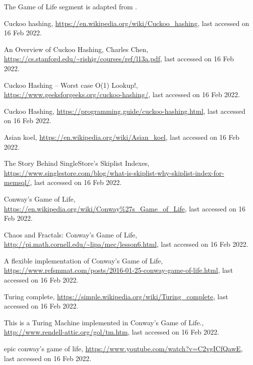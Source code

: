 \documentclass[addpoints]{exam}
\begin{document}
The Game of Life segment is adapted from \cite{gol_impl}.

\newpage
\begin{thebibliography}{9}

Cuckoo hashing, \url{https://en.wikipedia.org/wiki/Cuckoo_hashing}, last accessed on 16 Feb 2022.

An Overview of Cuckoo Hashing, Charles Chen, \url{https://cs.stanford.edu/~rishig/courses/ref/l13a.pdf}, last accessed on 16 Feb 2022.

Cuckoo Hashing – Worst case O(1) Lookup!, \url{https://www.geeksforgeeks.org/cuckoo-hashing/}, last accessed on 16 Feb 2022.

Cuckoo Hashing, \url{https://programming.guide/cuckoo-hashing.html}, last accessed on 16 Feb 2022.

Asian koel, \url{https://en.wikipedia.org/wiki/Asian_koel}, last accessed on 16 Feb 2022.

The Story Behind SingleStore’s Skiplist Indexes, \url{https://www.singlestore.com/blog/what-is-skiplist-why-skiplist-index-for-memsql/}, last accessed on 16 Feb 2022.

  Conway’s Game of Life, \url{https://en.wikipedia.org/wiki/Conway%27s_Game_of_Life}, last accessed on 16 Feb 2022.

  Chaos and Fractals: Conway’s Game of Life, \url{http://pi.math.cornell.edu/~lipa/mec/lesson6.html}, last accessed on 16 Feb 2022.
  
A flexible implementation of Conway's Game of Life, \url{https://www.refsmmat.com/posts/2016-01-25-conway-game-of-life.html}, last accessed on 16 Feb 2022.

Turing complete, \url{https://simple.wikipedia.org/wiki/Turing_complete}, last accessed on 16 Feb 2022.

  This is a Turing Machine implemented in Conway's Game of Life., \url{http://www.rendell-attic.org/gol/tm.htm}, last accessed on 16 Feb 2022.

epic conway's game of life, \url{https://www.youtube.com/watch?v=C2vgICfQawE}, last accessed on 16 Feb 2022.
\end{thebibliography}
\end{document}

